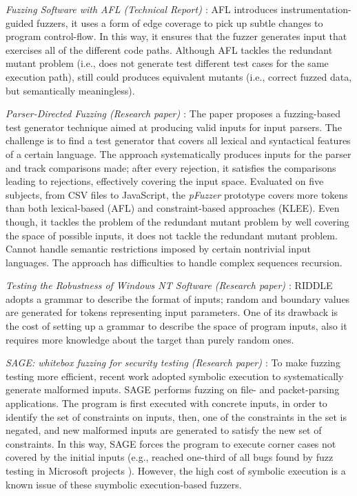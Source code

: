 \emph{Fuzzing Software with AFL (Technical Report) \cite{gutmann2016fuzzing}}: AFL introduces instrumentation-guided fuzzers, it uses a form of edge coverage to pick up subtle changes to program control-flow. In this way, it ensures that the fuzzer generates input that exercises all of the different code paths.
Although AFL tackles the redundant mutant problem (i.e., does not generate test different test cases for the same execution path), still could produces equivalent mutants (i.e., correct fuzzed data, but semantically meaningless).

\emph{Parser-Directed Fuzzing (Research paper) \cite{mathis2019parser}}: The paper proposes a fuzzing-based test generator technique aimed at producing valid inputs for input parsers. The challenge is to find a test generator that covers all lexical and syntactical features of a certain language. The approach systematically produces inputs for the parser and track comparisons made; after every rejection, it satisfies the comparisons leading to rejections, effectively covering the input space. 
Evaluated on five subjects, from CSV files to JavaScript, the \emph{pFuzzer} prototype covers more tokens than both lexical-based (AFL) and constraint-based approaches (KLEE).
Even though, it tackles the problem of the redundant mutant problem by well covering the space of possible inputs, it does not tackle the redundant mutant problem.
Cannot handle semantic restrictions imposed by certain nontrivial input languages. The approach has difficulties to handle complex sequences recursion.

\emph{Testing the Robustness of Windows NT Software (Research paper) \cite{ghosh1998testing}}: RIDDLE adopts a grammar to describe the format of inputs; random and boundary values are generated for tokens representing input parameters.
One of its drawback is the cost of setting up a grammar to describe the space of program inputs, also it requires more knowledge about the target than purely random ones.

\emph{SAGE: whitebox fuzzing for security testing (Research paper) \cite{godefroid2012sage}}: To make fuzzing testing more efficient, recent work adopted symbolic execution to systematically generate malformed inputs. SAGE performs fuzzing on file- and packet-parsing applications. 
The program is first executed with concrete inputs, in order to identify the set of constraints on inputs, then, one of the constraints in the set is negated, and new malformed inputs are generated to satisfy the new set of constraints. 
In this way, SAGE forces the program to execute corner cases not covered by the initial inputs (e.g., reached one-third of all bugs found by fuzz testing in Microsoft projects \cite{bounimova2013billions}). 
However, the high cost of symbolic execution is a known issue of these suymbolic execution-based fuzzers.

